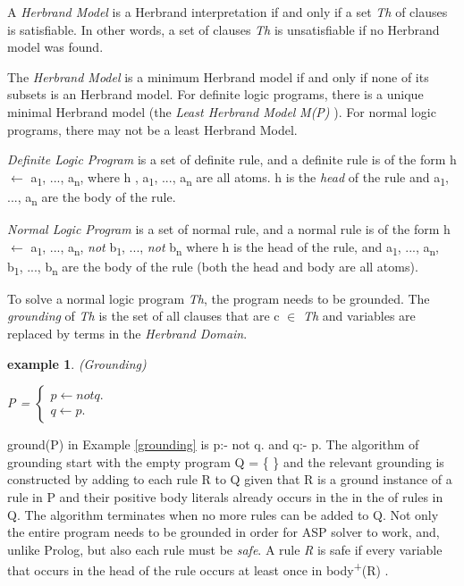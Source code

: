 \documentclass[12pt,twoside]{report}
\newtheorem{examp}{example}[section]
\begin{document}
A \textit{Herbrand Model} is a Herbrand interpretation if and only if a set \textit{Th} of clauses is satisfiable. In other words, a set of clauses \textit{Th} is unsatisfiable if no Herbrand model was found.

The \textit{Herbrand Model} is a minimum Herbrand model if and only if none of its subsets is an Herbrand model. 
For definite logic programs, there is a unique minimal Herbrand model (the \textit{Least Herbrand Model} \textit{M(P)} ).
For normal logic programs, there may not be a least Herbrand Model.

\textit{Definite Logic Program} is a set of definite rule, and  a definite rule is of the form h $\leftarrow$ a\textsubscript{1}, ..., a\textsubscript{n}, where h , a\textsubscript{1}, ..., a\textsubscript{n} are all atoms. h is the \textit{head} of the rule and a\textsubscript{1}, ..., a\textsubscript{n} are the body of the rule. 

\textit{Normal Logic Program} is a set of normal rule, and a normal rule is of the form h $\leftarrow$ a\textsubscript{1}, ..., a\textsubscript{n}, \textit{not} b\textsubscript{1}, ..., \textit{not}  b\textsubscript{n} where h is the head of the rule,
 and a\textsubscript{1}, ..., a\textsubscript{n}, b\textsubscript{1}, ..., b\textsubscript{n} are the body of the rule (both the head and body are all atoms).

To solve a normal logic program \textit{Th}, the program needs to be grounded. The \textit{grounding} of \textit{Th} is the set of all clauses that are c $\in$ \textit{Th} and variables are replaced by terms in the \textit{Herbrand Domain}.

\begin{examp} \normalfont (Grounding)

P = $\begin{cases}
	p  \leftarrow not q. \\
	q  \leftarrow p.
      \end{cases}$
\end{examp} 
\label{grounding}

ground(P) in Example \ref{grounding} is p:- not q. and q:- p. The algorithm of grounding start with the empty program Q = \{  \} and the relevant grounding is constructed by adding to each rule R to Q given that R is a ground instance of a rule in P and their positive body literals already occurs in the in the of rules in Q. The algorithm terminates when no more rules can be added to Q. 
Not only the entire program needs to be grounded in order for ASP solver to work, and, unlike Prolog,  but also each rule must be \textit{safe}. A rule \textit{R} is safe if every variable that occurs in the head of the rule occurs at least once in body\textsuperscript{+}(R) .
\end{document}
